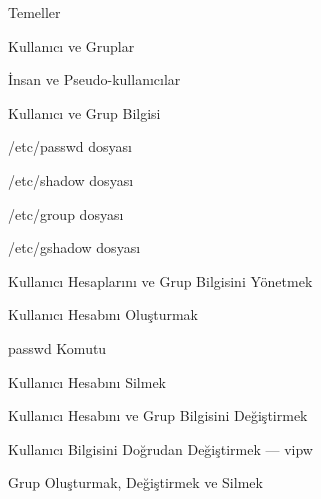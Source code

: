 \begin{section}{Temeller}
\begin{subsection}{Kullanıcı ve Gruplar}
\end{subsection}
\begin{subsection}{İnsan ve Pseudo-kullanıcılar}

\end{subsection}

\end{section}



\begin{section}{Kullanıcı ve Grup Bilgisi}

\begin{subsection}{/etc/passwd dosyası}

\end{subsection}
\begin{subsection}{/etc/shadow dosyası}

\end{subsection}
\begin{subsection}{/etc/group dosyası}

\end{subsection}
\begin{subsection}{/etc/gshadow dosyası}

\end{subsection}

\end{section}


\begin{section}{Kullanıcı Hesaplarını ve Grup Bilgisini Yönetmek}
\begin{subsection}{Kullanıcı Hesabını Oluşturmak}

\end{subsection}
\begin{subsection}{passwd Komutu}

\end{subsection}
\begin{subsection}{Kullanıcı Hesabını Silmek}

\end{subsection}
\begin{subsection}{Kullanıcı Hesabını ve Grup Bilgisini Değiştirmek}

\end{subsection}
\begin{subsection}{Kullanıcı Bilgisini Doğrudan Değiştirmek --- vipw}

\end{subsection}
\begin{subsection}{Grup Oluşturmak, Değiştirmek ve Silmek}

\end{subsection}

\end{section}